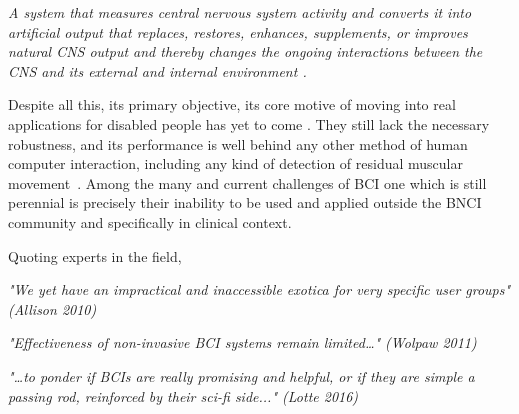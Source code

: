 \vspace{10px}

\begin{story}
\theoremstyle{definition}
\begin{definition}{}
\label{def:BCI}
\textit{A system that measures central nervous system activity and converts it into artificial output that replaces, restores, enhances, supplements, or improves natural CNS output and thereby changes the ongoing interactions between the CNS and its external and internal environment \cite{WolpawJonathanR2012}.}
\end{definition}
\end{story}

Despite all this, its primary objective, its core motive of moving into real applications for disabled people has yet to come \cite{Brunner2014,Jeunet2014,Allison2013}. They still lack the necessary robustness, and its performance is well behind any other method of human computer interaction, including any kind of detection of residual muscular movement~\cite{Clerc2016}. Among the many and current challenges of BCI \cite{Brunner2014} one which is still perennial is precisely their inability to be used and applied outside the BNCI community and specifically in clinical context.  

Quoting experts in the field,

\vspace{10px}

\textit{"We yet have an impractical and inaccessible exotica for very specific user groups" (Allison 2010)}

\vspace{10px}

\textit{"Effectiveness of non-invasive BCI systems remain limited…" (Wolpaw 2011)}

\vspace{10px}

\textit{"…to ponder if BCIs are really promising and helpful, or if they are simple a passing rod, reinforced by their sci-fi side..." (Lotte 2016)}

\vspace{10px}

